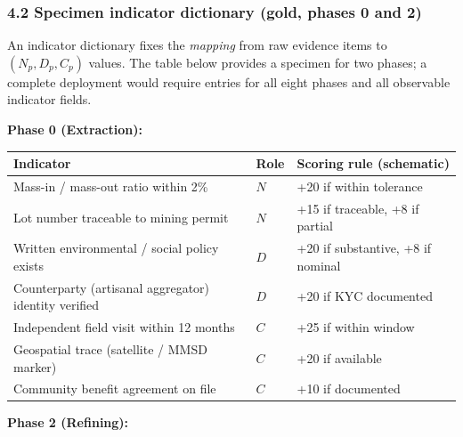 \documentclass[
  11pt,
  letterpaper,
]{article}
\begin{document}
\subsubsection{4.2 Specimen indicator dictionary (gold, phases 0 and
2)}\label{specimen-indicator-dictionary-gold-phases-0-and-2}

An indicator dictionary fixes the \emph{mapping} from raw evidence items
to \((N_p, D_p, C_p)\) values. The table below provides a specimen for
two phases; a complete deployment would require entries for all eight
phases and all observable indicator fields.

\textbf{Phase 0 (Extraction):}

\begin{longtable}[]{@{}
  >{\raggedright\arraybackslash}p{}
  >{\raggedright\arraybackslash}p{}
  >{\raggedright\arraybackslash}p{}@{}}
\toprule\noalign{}
\begin{minipage}[b]{\linewidth}\raggedright
Indicator
\end{minipage} & \begin{minipage}[b]{\linewidth}\raggedright
Role
\end{minipage} & \begin{minipage}[b]{\linewidth}\raggedright
Scoring rule (schematic)
\end{minipage} \\
\midrule\noalign{}
\endhead
\bottomrule\noalign{}
\endlastfoot
Mass-in / mass-out ratio within 2\% & \(N\) & +20 if within tolerance \\
Lot number traceable to mining permit & \(N\) & +15 if traceable, +8 if
partial \\
Written environmental / social policy exists & \(D\) & +20 if
substantive, +8 if nominal \\
Counterparty (artisanal aggregator) identity verified & \(D\) & +20 if
KYC documented \\
Independent field visit within 12 months & \(C\) & +25 if within
window \\
Geospatial trace (satellite / MMSD marker) & \(C\) & +20 if available \\
Community benefit agreement on file & \(C\) & +10 if documented \\
\end{longtable}

\textbf{Phase 2 (Refining):}
\end{document}

